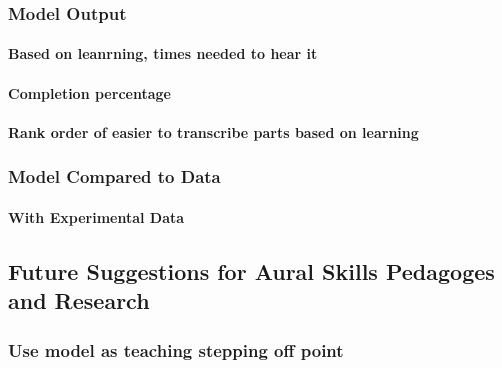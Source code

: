 \documentclass[]{book}
\let\oldparagraph\paragraph
\renewcommand{\paragraph}[1]{\oldparagraph{#1}\mbox{}}
\theoremstyle{definition}
\theoremstyle{definition}
\theoremstyle{definition}
\theoremstyle{remark}
\begin{document}
\hypertarget{model-output}{%
\subsubsection{Model Output}\label{model-output}}

\hypertarget{based-on-leanrning-times-needed-to-hear-it}{%
\paragraph{Based on leanrning, times needed to hear
it}\label{based-on-leanrning-times-needed-to-hear-it}}

\hypertarget{completion-percentage}{%
\paragraph{Completion percentage}\label{completion-percentage}}

\hypertarget{rank-order-of-easier-to-transcribe-parts-based-on-learning}{%
\paragraph{Rank order of easier to transcribe parts based on
learning}\label{rank-order-of-easier-to-transcribe-parts-based-on-learning}}

\hypertarget{model-compared-to-data}{%
\subsubsection{Model Compared to Data}\label{model-compared-to-data}}

\hypertarget{with-experimental-data}{%
\paragraph{With Experimental Data}\label{with-experimental-data}}

\hypertarget{future-suggestions-for-aural-skills-pedagoges-and-research}{%
\subsection{Future Suggestions for Aural Skills Pedagoges and
Research}\label{future-suggestions-for-aural-skills-pedagoges-and-research}}

\hypertarget{use-model-as-teaching-stepping-off-point}{%
\subsubsection{Use model as teaching stepping off
point}\label{use-model-as-teaching-stepping-off-point}}
\end{document}
